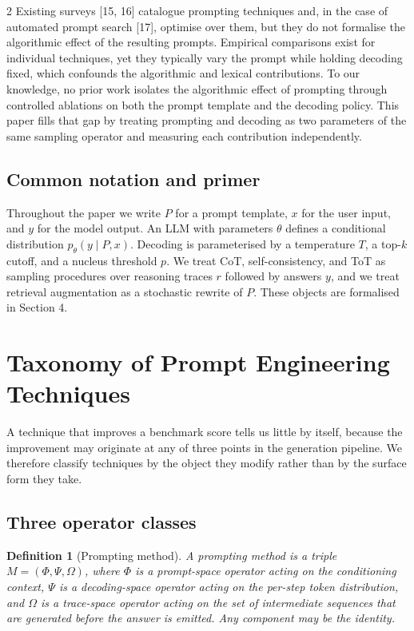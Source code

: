 \documentclass{article}
\begin{document}
\begin{multicols}{2}
Existing surveys [15, 16] catalogue prompting techniques and, in the case of automated prompt search [17], optimise over them, but they do not formalise the algorithmic effect of the resulting prompts. Empirical comparisons exist for individual techniques, yet they typically vary the prompt while holding decoding fixed, which confounds the algorithmic and lexical contributions. To our knowledge, no prior work isolates the algorithmic effect of prompting through controlled ablations on both the prompt template and the decoding policy. This paper fills that gap by treating prompting and decoding as two parameters of the same sampling operator and measuring each contribution independently.

\subsection{Common notation and primer}

Throughout the paper we write $P$ for a prompt template, $x$ for the user input, and $y$ for the model output. An LLM with parameters $\theta$ defines a conditional distribution $p_\theta(y \mid P, x)$. Decoding is parameterised by a temperature $T$, a top-$k$ cutoff, and a nucleus threshold $p$. We treat CoT, self-consistency, and ToT as sampling procedures over reasoning traces $r$ followed by answers $y$, and we treat retrieval augmentation as a stochastic rewrite of $P$. These objects are formalised in Section 4.

\section{Taxonomy of Prompt Engineering Techniques}

A technique that improves a benchmark score tells us little by itself, because the improvement may originate at any of three points in the generation pipeline. We therefore classify techniques by the object they modify rather than by the surface form they take.

\subsection{Three operator classes}

\textbf{Definition 1} (Prompting method). \textit{A prompting method is a triple $M = (\Phi, \Psi, \Omega)$, where $\Phi$ is a prompt-space operator acting on the conditioning context, $\Psi$ is a decoding-space operator acting on the per-step token distribution, and $\Omega$ is a trace-space operator acting on the set of intermediate sequences that are generated before the answer is emitted. Any component may be the identity.}


\end{multicols}
\end{document}
